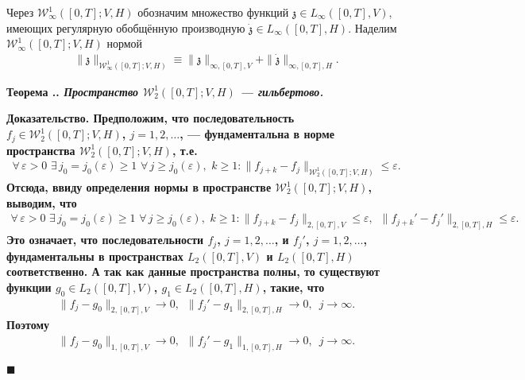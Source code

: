 \documentclass{report}
\newcounter{rem}[section]
\newcounter{theor}[section]
\renewcommand{\thetheor}{\thesection.\arabic{theor}}
\newenvironment{Theorem}{\par\refstepcounter{theor}\bf Теорема \thetheor. \it}{\rm\par}
\newenvironment{Proof}{\par\noindent\bf Доказательство.\rm}{ $\blacksquare$\par}
\begin{document}
Через $\mathcal{W}^1_\infty([0,T];V,H)$ обозначим множество функций $\mathfrak{z}\in L_\infty([0,T],V)$, имеющих регулярную обобщённую
производную $\dot{\mathfrak{z}}\in L_\infty([0,T],H)$. Наделим $\mathcal{W}^1_\infty([0,T];V,H)$ нормой
\begin{gather*}
\|\mathfrak{z}\|_{\mathcal{W}^1_\infty([0,T];V,H)}\equiv\|\mathfrak{z}\|_{\infty,[0,T],V}+\|\dot{\mathfrak{z}}\|_{\infty,[0,T],H}.
\end{gather*}

\begin{Theorem}
Пространство  $\mathcal{W}^1_2([0,T];V,H)$ --- гильбертово.
\end{Theorem}
\begin{Proof}
Предположим, что последовательность $f_j\in\mathcal{W}^1_2([0,T];V,H)$, $j=1,2,\dots$, --- фундаментальна в норме пространства $\mathcal{W}^1_2([0,T];V,H)$, т.е.
\begin{gather}\label{fundamentality_in_calW12([0,T];V,H)}
\forall\,\varepsilon>0\,\,\exists\,j_0=j_0(\varepsilon)\geqslant1\,\,\forall\,j\geqslant j_0(\varepsilon),\,\,k\geqslant1:
\|f_{j+k}-f_j\|_{\mathcal{W}^1_2([0,T];V,H)}\leqslant\varepsilon.
\end{gather}
Отсюда, ввиду определения нормы в пространстве $\mathcal{W}^1_2([0,T];V,H)$, выводим, что
\begin{gather*}
\forall\,\varepsilon>0\,\,\exists\,j_0=j_0(\varepsilon)\geqslant1\,\,\forall\,j\geqslant j_0(\varepsilon),\,\,k\geqslant1:
\|f_{j+k}-f_j\|_{2,[0,T],V}\leqslant\varepsilon,\,\,\,\|f_{j+k}'-f_j'\|_{2,[0,T],H}\leqslant\varepsilon.
\end{gather*}
Это означает, что последовательности $f_j$, $j=1,2,\dots$, и $f_j'$, $j=1,2,\dots$, фундаментальны в пространствах $L_2([0,T],V)$ и $L_2([0,T],H)$ соответственно. А так как данные
пространства полны, то существуют функции $g_0\in L_2([0,T],V)$, $g_1\in L_2([0,T],H)$, такие, что
\begin{gather}\label{convergence_of_fjf'j::::fundamentality_in_calW12([0,T];V,H)}
\|f_{j}-g_0\|_{2,[0,T],V}\to0,\,\,\,\|f_{j}'-g_1\|_{2,[0,T],H}\to0,\,\,\,j\to\infty.
\end{gather}
Поэтому
\begin{gather}\label{convergence_of_fjf'j:::1::::fundamentality_in_calW12([0,T];V,H)}
\|f_{j}-g_0\|_{1,[0,T],V}\to0,\,\,\,\|f_{j}'-g_1\|_{1,[0,T],H}\to0,\,\,\,j\to\infty.
\end{gather}


\end{Proof}
\end{document}
